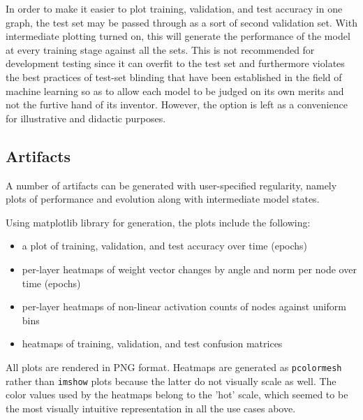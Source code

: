 \documentclass[10pt,epsf]{article}
\begin{document}
{{    In order to make it easier to plot training, validation, and test accuracy in
    one graph, the test set may be passed through as a sort of second validation set. With intermediate
    plotting turned on, this will generate the performance of the model at every training stage against
    all the sets. This is not recommended for development testing since it can overfit to the
    test set and furthermore violates the best practices of test-set blinding that have been established
    in the field of machine learning so as to allow each model to be judged on its own merits and not the furtive
    hand of its inventor. However, the option is left as a convenience for illustrative and didactic purposes.
  }
  \subsection{Artifacts}{
    A number of artifacts can be generated with user-specified regularity, namely plots of performance
    and evolution along with intermediate model states.

    Using matplotlib\autocite{mplpplot} library for generation, the plots include the following:
    \begin{itemize}
    \item{a plot of training, validation, and test accuracy over time (epochs)}
    \item{per-layer heatmaps of weight vector changes by angle and norm per node over time (epochs)}
    \item{per-layer heatmaps of non-linear activation counts of nodes against uniform bins}
    \item{heatmaps of training, validation, and test confusion matrices}
    \end{itemize}

    All plots are rendered in PNG format. Heatmaps are generated as \texttt{pcolormesh}\autocite{mplppcolormesh}
    rather than \texttt{imshow}\autocite{mplpimshow} plots because the latter do not visually scale as well.
    The color values used by the heatmaps belong to the 'hot' scale\autocite{mplpcolorbar}, which seemed to be the most visually intuitive representation in all the use cases above.

}}
\end{document}
